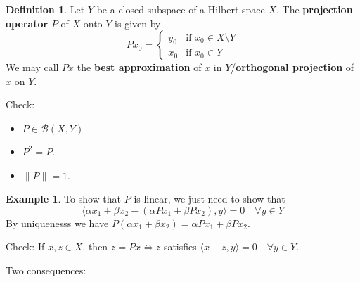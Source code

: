 \documentclass{article}
\theoremstyle{definition}
\newtheorem{ex}{Example}
\newtheorem{dfn}{Definition}
\begin{document}
\begin{dfn}
	Let $Y$ be a closed subspace of a Hilbert space $X$.
	The \textbf{projection operator} $P$ of $X$ onto $Y$ is given by
	\[
		P x_0 = 
		\begin{cases}
			y_0 & \text{if } x_0 \in X \setminus Y\\
			x_0 & \text{if } x_0 \in Y
		\end{cases}
	\]
	We may call $Px$ the \textbf{best approximation} of $x$ in $Y$/\textbf{orthogonal projection} of $x$ on $Y$.
\end{dfn}

Check:
\begin{itemize}
	\item $P \in \mathcal{B}(X, Y)$

	\item $P^2 = P$.

	\item $\|P\| = 1$.
\end{itemize}

\begin{ex}
	To show that $P$ is linear, we just need to show that
	\[
		\langle \alpha x_1 + \beta x_2 - (\alpha P x_1 + \beta P x_2), y \rangle = 0 \quad \forall y \in Y
	\]
	By uniquenesss we have $P(\alpha x_1 + \beta x_2) = \alpha P x_1 + \beta P x_2$.
\end{ex}

Check: If $x, z \in X$, then $z = Px \Leftrightarrow z$ satisfies $\langle x - z, y \rangle = 0 \quad \forall y \in Y$.

\par Two consequences:
\end{document}
